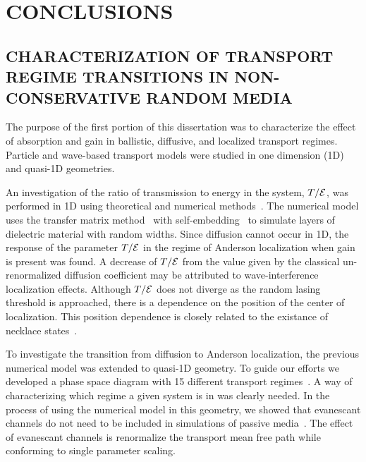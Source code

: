 
\chapter{CONCLUSIONS}

\section{CHARACTERIZATION OF TRANSPORT REGIME TRANSITIONS IN NON-CONSERVATIVE RANDOM MEDIA}

The purpose of the first portion of this dissertation was to characterize the effect of absorption and gain in ballistic, diffusive, and localized transport regimes. Particle and wave-based transport models were studied in one dimension (1D) and quasi-1D geometries. 

An investigation of the ratio of transmission to energy in the system, $T/{\cal E}$, was performed in 1D using theoretical and numerical methods~\cite{2010_Payne_TE}. %
The numerical model uses the transfer matrix method~\cite{1981_MacKinnon_scaling} with self-embedding~\cite{1999_yamilov_selfembed} to simulate layers of dielectric material with random widths. Since diffusion cannot occur in 1D, the response of the parameter $T/{\cal E}$ in the regime of Anderson localization when gain is present was found. A decrease of $T/{\cal E}$ from the value given by the classical un-renormalized diffusion coefficient may be attributed to wave-interference localization effects. Although $T/{\cal E}$ does not diverge as the random lasing threshold is approached, there is a dependence on the position of the center of localization. This position dependence is closely related to the existance of necklace states~\cite{1987_Pendry}. 

To investigate the transition from diffusion to Anderson localization, the previous numerical model was extended to quasi-1D geometry. To guide our efforts we developed a phase space diagram with 15 different transport regimes~\cite{2010_Yamilov_Regimes}. A way of characterizing which regime a given system is in was clearly needed. In the process of using the numerical model in this geometry, we showed that evanescant channels do not need to be included in simulations of passive media~\cite{2010_Payne_closed}. The effect of evanescant channels is renormalize the transport mean free path while conforming to single parameter scaling. 

